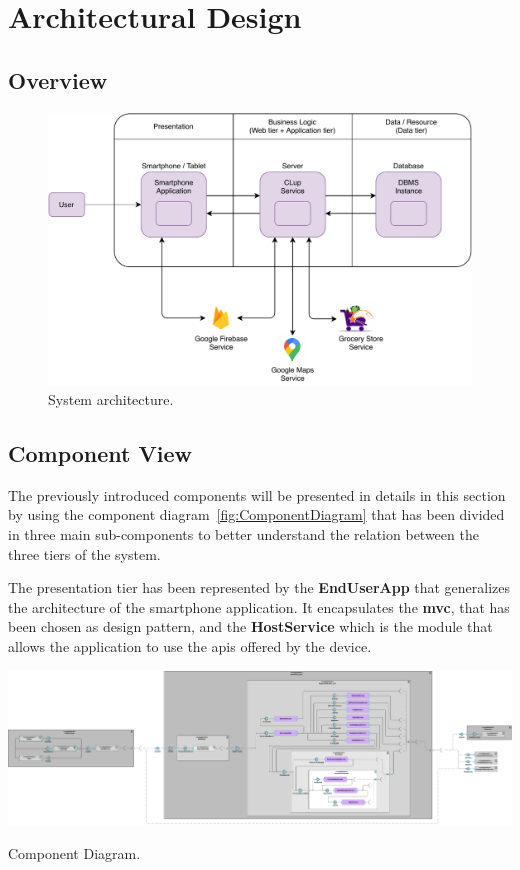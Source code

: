 \chapter{Architectural Design}

\section{Overview}

\begin{figure}[H]
	\centering
	\includegraphics[width=1.0\textwidth]{images/architecture.pdf}
	\caption{System architecture.}
\end{figure}

\section{Component View}

The previously introduced components will be presented in details in this section by using the component diagram~\ref{fig:ComponentDiagram} that has been divided in three main sub-components to better understand the relation between the three tiers of the system.

The presentation tier has been represented by the \textbf{EndUserApp} that generalizes the architecture of the smartphone application.
It encapsulates the \textbf{\gls{mvc}}, that has been chosen as design pattern, and the \textbf{HostService} which is the module that allows the application to use the \glspl{api} offered by the device.

\begin{table} %
	\centering
	\includegraphics[width=1.0\textwidth]{images/component_diagram.pdf}
	\caption{Component Diagram.}\label{fig:ComponentDiagram}
\end{table} %

